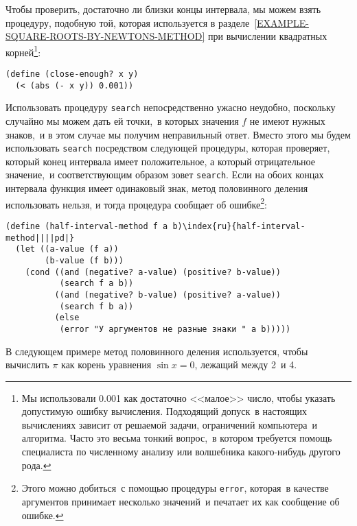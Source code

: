 Чтобы проверить, достаточно ли близки концы интервала, мы 
можем взять процедуру, подобную той, которая используется в
разделе~\ref{EXAMPLE-SQUARE-ROOTS-BY-NEWTONS-METHOD} при
вычислении квадратных корней\footnote{Мы использовали 0.001 как достаточно <<малое>> число, 
чтобы указать допустимую ошибку вычисления.
Подходящий допуск~в настоящих вычислениях зависит от
решаемой задачи, ограничений компьютера~и алгоритма.  Часто это весьма 
тонкий вопрос,~в котором требуется помощь 
специалиста по численному
анализу или волшебника какого-нибудь другого рода.
}:

\begin{Verbatim}[fontsize=\small]
(define (close-enough? x y)
  (< (abs (- x y)) 0.001))
\end{Verbatim}

Использовать процедуру {\tt search}
непосредственно ужасно неудобно, поскольку случайно мы можем дать ей
точки,~в которых значения $f$ не имеют нужных знаков,~и в
этом случае мы получим неправильный ответ.  Вместо этого мы будем
использовать {\tt search} посредством следующей процедуры,
которая проверяет, который конец интервала имеет положительное, а
который отрицательное значение,~и соответствующим образом зовет
{\tt search}.  Если на обоих концах интервала функция имеет
одинаковый знак, метод половинного деления использовать нельзя, и
тогда процедура сообщает об ошибке\footnote{Этого можно добиться~с помощью процедуры
{\tt error}, 
которая~в качестве аргументов принимает несколько
значений~и печатает их как сообщение об ошибке.
}:

\begin{Verbatim}[fontsize=\small]
(define (half-interval-method f a b)\index{ru}{half-interval-method||||pd|}
  (let ((a-value (f a))
        (b-value (f b)))
    (cond ((and (negative? a-value) (positive? b-value))
           (search f a b))
          ((and (negative? b-value) (positive? a-value))
           (search f b a))
          (else
           (error "У аргументов не разные знаки " a b)))))
\end{Verbatim}

В следующем примере метод половинного деления используется,
чтобы вычислить
$\pi$ как корень уравнения $\sin x =
0$, лежащий между 2~и 4.


